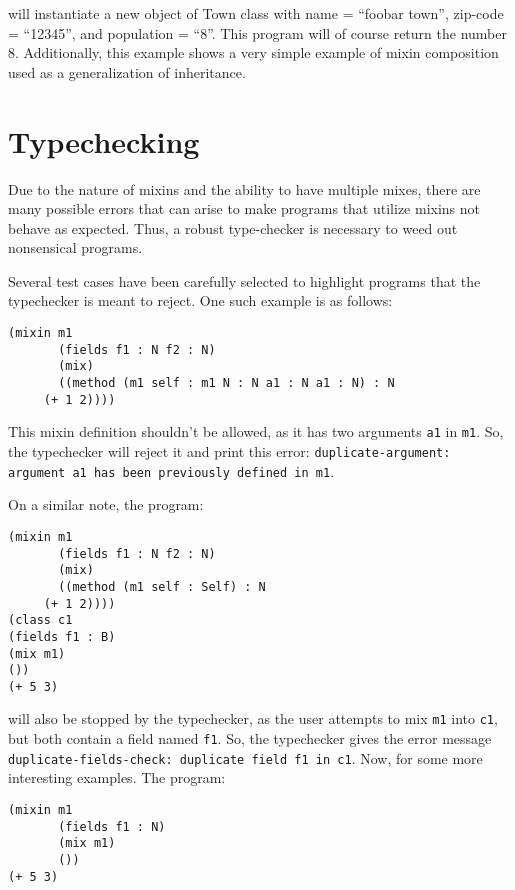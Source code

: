 \documentclass{article}
\begin{document}
will instantiate a new object of Town class with name = ``foobar town'', zip-code = ``12345'', and population = ``8''. This program will of course return the number 8. Additionally, this example shows a very simple example of mixin composition used as a generalization of inheritance.

\section*{Typechecking}
Due to the nature of mixins and the ability to have multiple mixes, there are many possible errors that can arise to make programs that utilize mixins not behave as expected. Thus, a robust type-checker is necessary to weed out nonsensical programs.

Several test cases have been carefully selected to highlight programs that the typechecker is meant to reject. One such example is as follows:
\begin{verbatim}
(mixin m1
       (fields f1 : N f2 : N)
       (mix)
       ((method (m1 self : m1 N : N a1 : N a1 : N) : N
	 (+ 1 2))))
\end{verbatim}
This mixin definition shouldn't be allowed, as it has two  arguments \verb|a1| in \verb|m1|. So, the typechecker will reject it and print this error: \verb|duplicate-argument: argument a1 has been previously defined in m1|.

On a similar note, the program:
\begin{verbatim}
(mixin m1
       (fields f1 : N f2 : N)
       (mix)
       ((method (m1 self : Self) : N
	 (+ 1 2))))
(class c1
(fields f1 : B)
(mix m1)
())
(+ 5 3)
\end{verbatim}

will also be stopped by the typechecker, as the user attempts to mix \verb|m1| into \verb|c1|, but both contain a field named \verb|f1|. So, the typechecker gives the error message \verb|duplicate-fields-check: duplicate field f1 in c1|.
Now, for some more interesting examples. The program:
\begin{verbatim}
(mixin m1
       (fields f1 : N)
       (mix m1)
       ())
(+ 5 3)
\end{verbatim}
\end{document}
